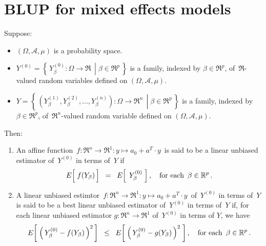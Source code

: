 

\section{BLUP for mixed effects models}
\setcounter{theorem}{0}
\setcounter{equation}{0}

\renewcommand{\theenumi}{\roman{enumi}}
\renewcommand{\labelenumi}{\textnormal{(\theenumi)}$\;\;$}


\begin{definition}
\mbox{}
\vskip 0.2cm
\noindent
Suppose:
\begin{itemize}
\item
	$(\Omega,\mathcal{A},\mu)$ is a probability space.
\item
	$Y^{(0)} = \left\{\,\left.Y^{(0)}_{\beta} : \Omega \longrightarrow \Re\,\;\right\vert\;\beta\in\Re^{p}\,\right\}$
	is a family, indexed by $\beta \in \Re^{p}$, of \,$\Re$-valued random variables
	defined on $(\Omega,\mathcal{A},\mu)$.
\item
	$Y = \left\{\,\left.(Y^{(1)}_{\beta}, Y^{(2)}_{\beta}, \ldots, Y^{(n)}_{\beta})
	: \Omega \longrightarrow \Re^{n}\,\;\right\vert\; \beta \in \Re^{p} \,\right\}$
	is a family, indexed by $\beta \in \Re^{p}$, of \,$\Re^{n}$-valued random variable
	defined on $(\Omega,\mathcal{A},\mu)$.
\end{itemize}
Then:
\begin{enumerate}
\item
	An affine function
	\,$f : \Re^{n} \longrightarrow \Re^{1} : y \longmapsto a_{0} + a^{T} \cdot y$\,
	is said to be a
	{\color{red}linear unbiased estimator of \,$Y^{(0)}$ in terms of \,$Y$} if
	\begin{equation*}
	E\!\left[\;\overset{{\color{white}.}}{f}(Y_{\beta})\,\right]
	\;\; = \;\;
		E\!\left[\;\,Y^{(0)}_{\beta}\;\right],
	\quad
	\textnormal{for each \,$\beta \in \Re^{p}$}\,.
	\end{equation*}
\item
	A linear unbiased estimtor
	\,$f : \Re^{n} \longrightarrow \Re^{1} : y \longmapsto a_{0} + a^{T} \cdot y$\,
	of \,$Y^{(0)}$ in terms of \,$Y$\, is said to be a
	{\color{red}best linear unbiased estimator of \,$Y^{(0)}$ in terms of \,$Y$} if,
	for each linear unbiased estimator $g : \Re^{n} \longrightarrow \Re^{1}$
	of \,$Y^{(0)}$ in terms of $Y$, we have
	\begin{equation*}
	E\!\left[\; \left(\,Y^{(0)}_{\beta } - \overset{{\color{white}.}}{f}(Y_{\beta})\,\right)^{2}\,\right]
	\;\; \leq \;\;
		E\!\left[\;\left(\,Y^{(0)}_{\beta } - \overset{{\color{white}.}}{g}(Y_{\beta})\,\right)^{2}\;\right],
	\quad
	\textnormal{for each \,$\beta \in \Re^{p}$}\,.
	\end{equation*}
\end{enumerate}
\end{definition}

